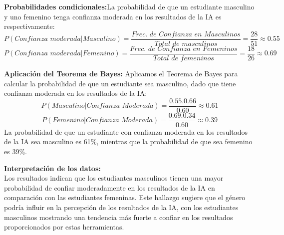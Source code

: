 \textbf{Probabilidades condicionales:}La probabilidad de que un estudiante masculino y uno femenino tenga confianza moderada en los resultados de la IA es respectivamente:
\begin{equation*}
	P(\textit{Confianza moderada|Masculino}) = \frac{\textit{Frec. de Confianza en Masculinos}}{\textit{Total de masculinos}} = \frac{28}{51} \approx 0.55
\end{equation*}
\begin{equation*}
	P(\textit{Confianza moderada|Femenino}) = \frac{\textit{Frec. de Confianza en Femeninos}}{\textit{Total de femeninos}} = \frac{18}{26} \approx 0.69
\end{equation*}

\textbf{Aplicación del Teorema de Bayes:} Aplicamos el Teorema de Bayes para calcular la probabilidad de que un estudiante sea masculino, dado que tiene confianza moderada en los resultados de la IA:
\begin{equation*}
	P(\textit{Masculino|Confianza Moderada}) = \frac{0.55 . 0.66}{0.60} \approx 0.61
\end{equation*}
\begin{equation*}
	P(\textit{Femenino|Confianza Moderada}) = \frac{0.69 . 0.34}{0.60} \approx 0.39
\end{equation*}
La probabilidad de que un estudiante con confianza moderada en los resultados de la IA sea masculino es 61\%, mientras que la probabilidad de que sea femenino es 39\%.

\textbf{Interpretación de los datos:}\\
Los resultados indican que los estudiantes masculinos tienen una mayor probabilidad de confiar moderadamente en los resultados de la IA en comparación con las estudiantes femeninas. Este hallazgo sugiere que el género podría influir en la percepción de los resultados de la IA, con los estudiantes masculinos mostrando una tendencia más fuerte a confiar en los resultados proporcionados por estas herramientas.